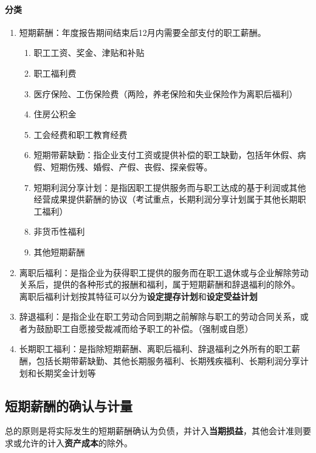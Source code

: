 \documentclass[UTF8,12pt]{ctexart}
\numberwithin{equation}{section} %
\numberwithin{figure}{section}
\numberwithin{table}{section}
\begin{document}
	\paragraph{分类}
	\begin{enumerate}
		\item 短期薪酬：年度报告期间结束后12月内需要全部支付的职工薪酬。
		\begin{enumerate}
			\item 职工工资、奖金、津贴和补贴
			
			\item 职工福利费
			
			\item 医疗保险、工伤保险费（两险，养老保险和失业保险作为离职后福利）
			
			\item 住房公积金
			
			\item 工会经费和职工教育经费
			
			\item 短期带薪缺勤：指企业支付工资或提供补偿的职工缺勤，包括年休假、病假、短期伤残、婚假、产假、丧假、探亲假等。
			
			\item 短期利润分享计划：是指因职工提供服务而与职工达成的基于利润或其他经营成果提供薪酬的协议（考试重点，长期利润分享计划属于其他长期职工福利）
			
			\item 非货币性福利
			
			\item 其他短期薪酬
		\end{enumerate}
		
		\item 离职后福利：是指企业为获得职工提供的服务而在职工退休或与企业解除劳动关系后，提供的各种形式的报酬和福利，属于短期薪酬和辞退福利的除外。 离职后福利计划按其特征可以分为\textbf{设定提存计划}和\textbf{设定受益计划}
		
		\item 辞退福利：是指企业在职工劳动合同到期之前解除与职工的劳动合同关系，或者为鼓励职工自愿接受裁减而给予职工的补偿。（强制或自愿）
		
		\item 长期职工福利：是指除短期薪酬、离职后福利、辞退福利之外所有的职工薪酬，包括长期带薪缺勤、其他长期服务福利、长期残疾福利、长期利润分享计划和长期奖金计划等
	\end{enumerate}
	
	\subsection{短期薪酬的确认与计量}
	总的原则是将实际发生的短期薪酬确认为负债，并计入\textbf{当期损益}，其他会计准则要求或允许的计入\textbf{资产成本}的除外。
	
\end{document}
